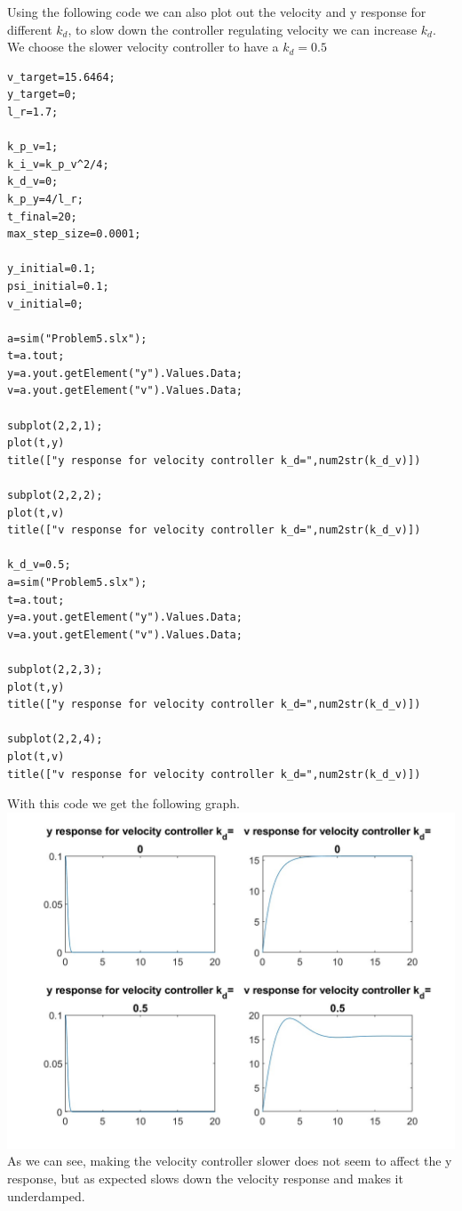 \documentclass[12pt]{article}
\begin{document}
Using the following code we can also plot out the velocity and y response for different $k_d$, to slow down the controller
regulating velocity we can increase $k_d$. We choose the slower velocity controller to have a $k_d=0.5$
\begin{verbatim}
v_target=15.6464;
y_target=0;
l_r=1.7;

k_p_v=1;
k_i_v=k_p_v^2/4;
k_d_v=0;
k_p_y=4/l_r;
t_final=20;
max_step_size=0.0001;

y_initial=0.1;
psi_initial=0.1;
v_initial=0;

a=sim("Problem5.slx");
t=a.tout;
y=a.yout.getElement("y").Values.Data;
v=a.yout.getElement("v").Values.Data;

subplot(2,2,1); 
plot(t,y)
title(["y response for velocity controller k_d=",num2str(k_d_v)])

subplot(2,2,2); 
plot(t,v)
title(["v response for velocity controller k_d=",num2str(k_d_v)])

k_d_v=0.5;
a=sim("Problem5.slx");
t=a.tout;
y=a.yout.getElement("y").Values.Data;
v=a.yout.getElement("v").Values.Data;

subplot(2,2,3); 
plot(t,y)
title(["y response for velocity controller k_d=",num2str(k_d_v)])

subplot(2,2,4); 
plot(t,v)
title(["v response for velocity controller k_d=",num2str(k_d_v)])
\end{verbatim}
With this code we get the following graph.\\
\includegraphics[scale=0.3]{Problem5Fig4.jpg}\\
As we can see, making the velocity controller slower does not seem to affect the y response, but as expected slows down the velocity response
and makes it underdamped.
\end{document}
